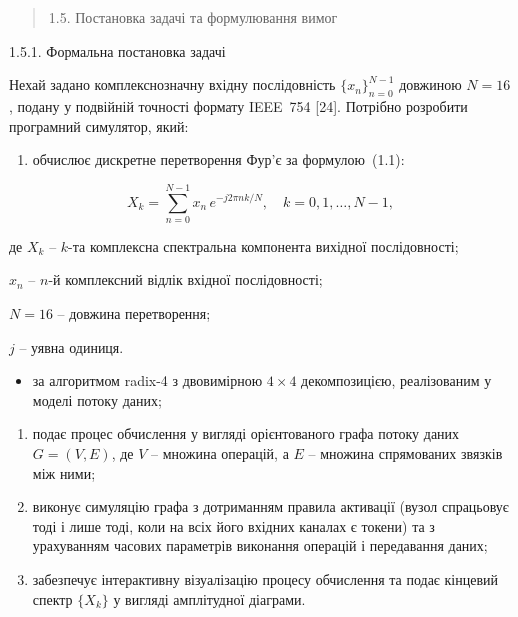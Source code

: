 \documentclass[
]{article}
\begin{document}
\begin{quote}
\protect{}\label{ux43fux43eux441ux442ux430ux43dux43eux432ux43aux430-ux437ux430ux434ux430ux447ux456-ux442ux430-ux444ux43eux440ux43cux443ux43bux44eux432ux430ux43dux43dux44f-ux432ux438ux43cux43eux433}{}1.5.
Постановка задачі та формулювання вимог
\end{quote}

1.5.1. Формальна постановка задачі

Нехай задано комплекснозначну вхідну послідовність
\(\{ x_{n}\}_{n = 0}^{N - 1}\) довжиною \(N = 16\), подану у подвійній
точності формату IEEE~754 {[}24{]}. Потрібно розробити програмний
симулятор, який:

\begin{enumerate}
\def\labelenumi{\arabic{enumi}.}
\item
  обчислює дискретне перетворення Фур'є за формулою~(1.1):
\end{enumerate}

\begin{equation}
\tag{1.1}\label{eq:dft}
X_{k} = \sum_{n = 0}^{N - 1}x_{n}\, e^{- j2\pi nk/N},\quad k = 0,1,\ldots,N - 1,
\end{equation}

де \(X_{k}\) -- \(k\)-та комплексна спектральна компонента вихідної послідовності;

\(x_{n}\) -- \(n\)-й комплексний відлік вхідної послідовності;

\(N = 16\) -- довжина перетворення;

\(j\) -- уявна одиниця.

\begin{itemize}
\item
  за алгоритмом radix-4 з двовимірною \(4 \times 4\) декомпозицією,
  реалізованим у моделі потоку даних;
\end{itemize}

\begin{enumerate}
\def\labelenumi{\arabic{enumi}.}
\item
  подає процес обчислення у вигляді орієнтованого графа потоку даних
  \(G = (V,E)\), де \(V\) -- множина операцій, а \(E\) -- множина
  спрямованих зв\textquotesingle язків між ними;
\item
  виконує симуляцію графа з дотриманням правила активації (вузол
  спрацьовує тоді і лише тоді, коли на всіх його вхідних каналах є
  токени) та з урахуванням часових параметрів виконання операцій і
  передавання даних;
\item
  забезпечує інтерактивну візуалізацію процесу обчислення та подає
  кінцевий спектр \(\{ X_{k}\}\) у вигляді амплітудної діаграми.
\end{enumerate}
\end{document}

